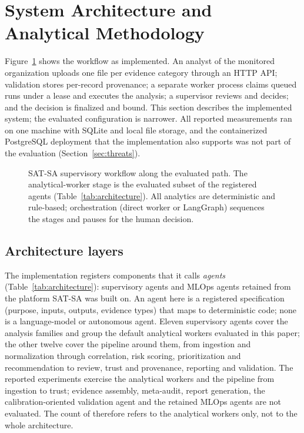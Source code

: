 \section{System Architecture and Analytical Methodology}
\label{sec:system}

Figure~\ref{fig:architecture} shows the workflow as implemented. An analyst of the
monitored organization uploads one file per evidence category through an HTTP API;
validation stores per-record provenance; a separate worker process claims queued
runs under a lease and executes the analysis; a supervisor reviews and decides; and
the decision is finalized and bound. This section describes the implemented
system; the evaluated configuration is narrower. All reported measurements ran on
one machine with SQLite and local file storage, and the containerized PostgreSQL
deployment that the implementation also supports was not part of the evaluation
(Section~\ref{sec:threats}).

\begin{figure}[!htbp]
\centering

\caption{SAT-SA supervisory workflow along the evaluated path. The analytical-worker
stage is the evaluated subset of the registered agents (Table~\ref{tab:architecture}).
All analytics are deterministic and rule-based; orchestration (direct worker or
LangGraph) sequences the stages and pauses for the human decision.}
\label{fig:architecture}
\end{figure}

\subsection{Architecture layers}
The implementation registers  components that it calls
\emph{agents} (Table~\ref{tab:architecture}):  supervisory agents
and  MLOps agents retained from the platform SAT-SA was built on.
An agent here is a registered specification (purpose, inputs, outputs, evidence types)
that maps to deterministic code; none is a language-model or autonomous agent. Eleven
supervisory agents cover the analysis families and group the  default
analytical workers evaluated in this paper; the other twelve cover the pipeline around
them, from ingestion and normalization through correlation, risk scoring,
prioritization and recommendation to review, trust and provenance, reporting and
validation. The reported experiments exercise the analytical workers and the
pipeline from ingestion to trust; evidence assembly, meta-audit, report generation,
the calibration-oriented validation agent and the retained MLOps agents are not
evaluated. The count of  therefore refers to the analytical workers
only, not to the whole architecture.


